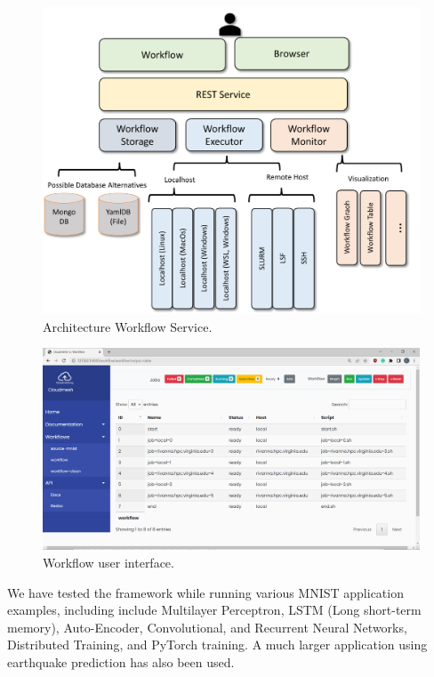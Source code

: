 \begin{figure}[htb]
    \centering
    \includegraphics[width=1.0\columnwidth]{images/cc.pdf}
    \caption{Architecture Workflow Service.}\label{fig:cc-2}
\end{figure}

\begin{figure}[htb]
    \centering
    \includegraphics[width=1.0\columnwidth]{images/cc-1.png}
    \caption{Workflow user interface.}\label{fig:cc-3}
\end{figure}

We have tested the framework while running various MNIST application examples, including include Multilayer Perceptron, LSTM (Long short-term memory), Auto-Encoder, Convolutional, and Recurrent Neural Networks, Distributed Training, and PyTorch training. 
A much larger application using earthquake prediction has also been used.

